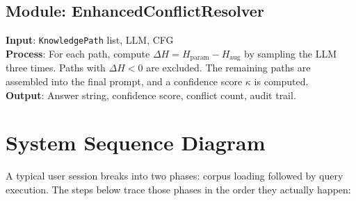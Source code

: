 \subsection{Module: EnhancedConflictResolver}

\textbf{Input}: \texttt{KnowledgePath} list, LLM, CFG\\
\textbf{Process}: For each path, compute $\Delta H = H_{\text{param}} - H_{\text{aug}}$
by sampling the LLM three times. Paths with $\Delta H < 0$ are excluded.
The remaining paths are assembled into the final prompt, and a confidence
score $\kappa$ is computed.\\
\textbf{Output}: Answer string, confidence score, conflict count, audit trail.

\section{System Sequence Diagram}

A typical user session breaks into two phases: corpus loading followed by
query execution. The steps below trace those phases in the order they actually
happen:

